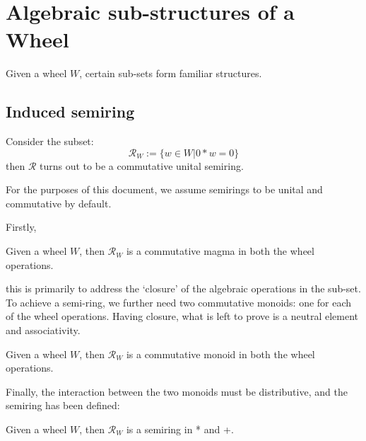 \section{Algebraic sub-structures of a Wheel} 
Given a wheel $W$, certain sub-sets form familiar structures. 
\subsection{Induced semiring}
Consider the subset:
\[
\mathcal{R}_{W} := \{ w \in W | 0*w = 0 \}
\]
then $\mathcal{R}$ turns out to be a commutative unital semiring.
\begin{remark}
 For the purposes of this document, we assume semirings to be unital and commutative by default.
\end{remark}
Firstly,
\begin{definition}
  \leanok
  Given a wheel $W$, then $\mathcal{R}_{W}$ is a commutative magma in both the wheel operations.
\end{definition}
this is primarily to address the `closure' of the algebraic operations in the sub-set. To achieve a semi-ring,
we further need two commutative monoids: one for each of the wheel operations. Having closure, what is left to prove is
a neutral element and associativity.
\begin{definition}
  \leanok
  Given a wheel $W$, then $\mathcal{R}_{W}$ is a commutative monoid in both the wheel operations.
\end{definition}
Finally, the interaction between the two monoids must be distributive, and the semiring has been defined:
\begin{definition}
  Given a wheel $W$, then $\mathcal{R}_{W}$ is a semiring in * and +.
\end{definition}
